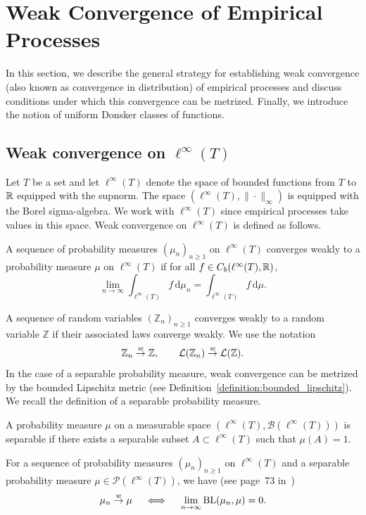 \section{Weak Convergence of Empirical Processes}\label{appendix:weakconvergence}
In this section, we describe the general strategy for establishing weak convergence (also known as convergence in distribution) of empirical processes and discuss conditions under which this convergence can be metrized. Finally, we introduce the notion of uniform Donsker
classes of functions. 

\subsection{Weak convergence on $\ell^\infty(T)$}
Let $T$ be a set and let $\ell^\infty(T)$ denote the space of bounded functions from $T$ to $\mathbb{R}$ equipped with the supnorm. The space $\left(\ell^\infty(T), \|\cdot\|_\infty\right)$ is equipped with the Borel sigma-algebra. We work with $\ell^\infty(T)$ since empirical processes take values in this space. Weak convergence on $\ell^\infty(T)$ is defined as follows.


\begin{definition}\label{definition::weak_convergence}
A sequence of probability measures $(\mu_n)_{n \geq 1}$ on $\ell^\infty(T)$ converges weakly to a probability measure $\mu$ on $\ell^\infty(T)$ if for all $ f \in C_b(\ell^\infty(T), \mathbb{R})$,
\[
\lim_{n \to \infty}\int_{\ell^\infty(T)} f \, \mathrm{d}\mu_n = \int_{\ell^\infty(T)} f \, \mathrm{d}\mu.
\]
\end{definition}
A sequence of random variables $\left(\mathbb{Z}_n\right)_{n\geq 1}$ converges weakly to a random variable $\mathbb{Z}$ if their associated laws converge weakly. We use the notation
\[
\mathbb{Z}_n \overset{w}{\to} \mathbb{Z}, \qquad
\mathcal{L}(\mathbb{Z}_n) \overset{w}{\to} \mathcal{L}(\mathbb{Z}).
\]
In the case of a separable probability measure, weak convergence can be metrized by the bounded Lipschitz metric (see Definition~\ref{definition:bounded_lipschitz}). We recall the definition of a separable probability measure.
\begin{definition}\label{definition::separable_probmeasure}
A probability measure $\mu$ on a measurable space $\left(\ell^\infty(T), \mathcal{B}\left(\ell^\infty(T)\right) \right)$ is separable if there exists a separable subset $A \subset \ell^\infty(T)$ such that $\mu\left(A\right) = 1$.
\end{definition}
For a sequence of probability measures $(\mu_n)_{n\geq 1}$ on $\ell^\infty(T)$ and a separable probability measure $\mu \in \mathcal{P}(\ell^\infty(T))$, we have (see page~73 in~\cite{van1996weak})
\begin{equation}\label{equation:bl_metrizes_weakconvergence}
\mu_n \overset{w}{\to} \mu \quad \iff \quad \lim_{n \to \infty} \mathrm{BL}(\mu_n, \mu) = 0.
\end{equation}


